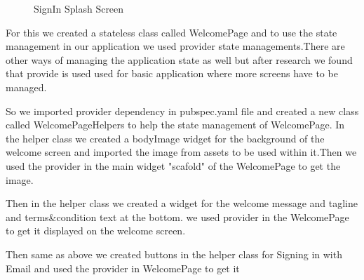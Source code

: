 \begin{figure}[H]
    \caption{SignIn Splash Screen}
    \label{fig:Welcome Screen}
\end{figure}

For this we created a stateless class called WelcomePage and to use the state management in our application we used provider state managements.There are other ways of managing the application state as well but after research we found that provide is used used for basic application where more screens have to be managed.

So we imported provider dependency in pubspec.yaml file and created a new class called WelcomePageHelpers to help the state management of WelcomePage. In the helper class we created a bodyImage widget for the background of the welcome screen and imported the image from assets to be used within it.Then we used the provider in the main widget "scafold" of the WelcomePage to get the image.

Then in the helper class we created a widget for the welcome message and tagline and terms\&condition text at the bottom. we used provider in the WelcomePage to get it displayed on the welcome screen.

Then same as above we created buttons in the helper class for Signing in with Email and used the provider in WelcomePage to get it

